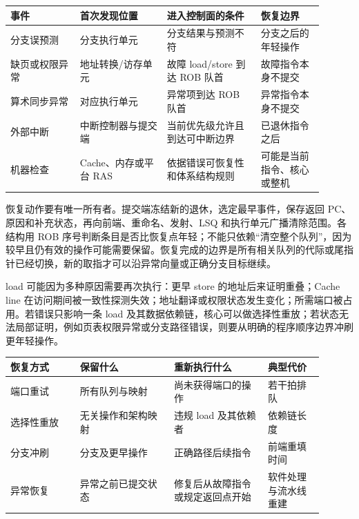 \begin{longtable}{L{0.20\linewidth}L{0.25\linewidth}L{0.27\linewidth}L{0.18\linewidth}}
\toprule
事件 & 首次发现位置 & 进入控制面的条件 & 恢复边界 \\
\midrule
分支误预测 & 分支执行单元 & 分支结果与预测不符 & 分支之后的年轻操作 \\\tablerowrule
缺页或权限异常 & 地址转换/访存单元 & 故障 load/store 到达 ROB 队首 & 故障指令本身不提交 \\\tablerowrule
算术同步异常 & 对应执行单元 & 异常项到达 ROB 队首 & 异常指令本身不提交 \\\tablerowrule
外部中断 & 中断控制器与提交端 & 当前优先级允许且到达可中断边界 & 已退休指令之后 \\\tablerowrule
机器检查 & Cache、内存或平台 RAS & 依据错误可恢复性和体系结构规则 & 可能是当前指令、核心或整机 \\
\bottomrule
\end{longtable}

恢复动作要有唯一所有者。提交端冻结新的退休，选定最早事件，保存返回 PC、原因和补充状态，再向前端、重命名、发射、LSQ 和执行单元广播清除范围。各结构用 ROB 序号判断条目是否比恢复点年轻；不能只依赖“清空整个队列”，因为较早且仍有效的操作可能需要保留。恢复完成的边界是所有相关队列的代际或尾指针已经切换，新的取指才可以沿异常向量或正确分支目标继续。


load 可能因为多种原因需要再次执行：更早 store 的地址后来证明重叠；Cache line 在访问期间被一致性探测失效；地址翻译或权限状态发生变化；所需端口被占用。若错误只影响一条 load 及其数据依赖链，核心可以做选择性重放；若状态无法局部证明，例如页表权限异常或分支路径错误，则要从明确的程序顺序边界冲刷更年轻操作。

\begin{longtable}{L{0.20\linewidth}L{0.27\linewidth}L{0.27\linewidth}L{0.16\linewidth}}
\toprule
恢复方式 & 保留什么 & 重新执行什么 & 典型代价 \\
\midrule
端口重试 & 所有队列与映射 & 尚未获得端口的操作 & 若干拍排队 \\\tablerowrule
选择性重放 & 无关操作和架构映射 & 违规 load 及其依赖者 & 依赖链长度 \\\tablerowrule
分支冲刷 & 分支及更早操作 & 正确路径后续指令 & 前端重填时间 \\\tablerowrule
异常恢复 & 异常之前已提交状态 & 修复后从故障指令或规定返回点开始 & 软件处理与流水线重建 \\
\bottomrule
\end{longtable}

